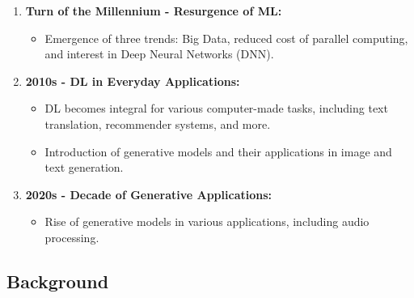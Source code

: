\begin{frame}
{\begin{enumerate}
            \item \textbf{Turn of the Millennium - Resurgence of ML:}
                  \begin{itemize}
                      \item Emergence of three trends: Big Data, reduced cost of parallel computing, and interest in Deep Neural Networks (DNN).
                  \end{itemize}

            \item \textbf{2010s - DL in Everyday Applications:}
                  \begin{itemize}
                      \item DL becomes integral for various computer-made tasks, including text translation, recommender systems, and more.
                      \item Introduction of generative models and their applications in image and text generation.
                  \end{itemize}

            \item \textbf{2020s - Decade of Generative Applications:}
                  \begin{itemize}
                      \item Rise of generative models in various applications, including audio processing.
                  \end{itemize}
        \end{enumerate}
    }
\end{frame}


\subsection{Background}

